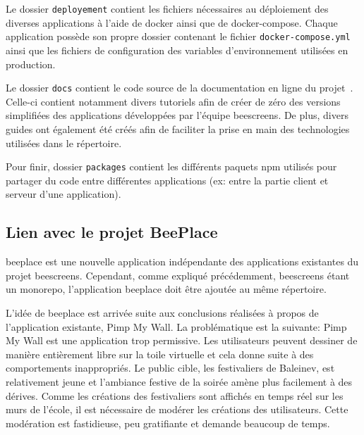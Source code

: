 Le dossier \texttt{deployement} contient les fichiers nécessaires au déploiement des diverses applications à l'aide de \gls{docker} ainsi que de \gls{docker-compose}. Chaque application possède son propre dossier contenant le fichier  \texttt{docker-compose.yml} ainsi que les fichiers de configuration des variables d'environnement utilisées en production.

Le dossier \texttt{docs} contient le code source de la documentation en ligne du projet~\cite{beescreensdocs}. Celle-ci contient notamment divers tutoriels afin de créer de zéro des versions simplifiées des applications développées par l'équipe \gls{beescreens}. De plus, divers guides ont également été créés afin de faciliter la prise en main des technologies utilisées dans le répertoire.

Pour finir, dossier \texttt{packages} contient les différents paquets \gls{npm} utilisés pour partager du code entre différentes applications (ex: entre la partie client et serveur d'une application).





\subsection{Lien avec le projet BeePlace}
\label{sec:lien-avec-le-projet-beeplace}

\gls{beeplace} est une nouvelle application indépendante des applications existantes du projet \gls{beescreens}. Cependant, comme expliqué précédemment, \gls{beescreens} étant un monorepo, l'application \gls{beeplace} doit être ajoutée au même répertoire.

L'idée de \gls{beeplace} est arrivée suite aux conclusions réalisées à propos de l'application existante, Pimp My Wall. La problématique est la suivante: Pimp My Wall est une application trop permissive. Les utilisateurs peuvent dessiner de manière entièrement libre sur la toile virtuelle et cela donne suite à des comportements inappropriés. Le public cible, les festivaliers de Baleinev, est relativement jeune et l'ambiance festive de la soirée amène plus facilement à des dérives. Comme les créations des festivaliers sont affichés en temps réel sur les murs de l'école, il est nécessaire de modérer les créations des utilisateurs. Cette modération est fastidieuse, peu gratifiante et demande beaucoup de temps.

